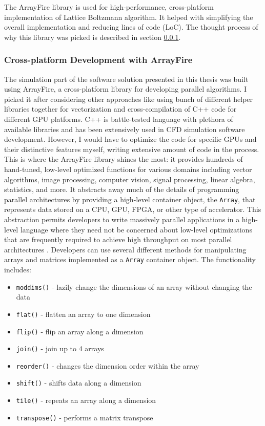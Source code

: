 The ArrayFire library is used for high-performance, cross-platform implementation of Lattice Boltzmann algorithm. It helped with simplifying the overall implementation and reducing lines of code (LoC). The thought process of why this library was picked is described in section \ref{sec:cross-platform-af}.

\subsubsection{Cross-platform Development with ArrayFire}\label{sec:cross-platform-af}
The simulation part of the software solution presented in this thesis was built using ArrayFire, a cross-platform library for developing parallel algorithms. I picked it after considering other approaches like using bunch of different helper libraries together for vectorization and cross-compilation of C++ code for different GPU platforms. C++ is battle-tested language with plethora of available libraries and has been extensively used in CFD simulation software development. However, I would have to optimize the code for specific GPUs and their distinctive features myself, writing extensive amount of code in the process. This is where the ArrayFire library shines the most: it provides hundreds of hand-tuned, low-level optimized functions for various domains including vector algorithms, image processing, computer vision, signal processing, linear algebra, statistics, and more. It abstracts away much of the details of programming parallel architectures by providing a high-level container object, the \texttt{Array}, that represents data stored on a CPU, GPU, FPGA, or other type of accelerator. This abstraction permits developers to write massively parallel applications in a high-level language where they need not be concerned about low-level optimizations that are frequently required to achieve high throughput on most parallel architectures \citep{Yalamanchili2015}. Developers can use several different methods for manipulating arrays and matrices implemented as a \texttt{Array} container object. The functionality includes:

\begin{itemize}
	\item \texttt{moddims()} - lazily change the dimensions of an array without changing the data
	\item \texttt{flat()}  - flatten an array to one dimension
	\item \texttt{flip()}  - flip an array along a dimension
	\item \texttt{join()}  - join up to 4 arrays
	\item \texttt{reorder()}  - changes the dimension order within the array
	\item \texttt{shift()}  - shifts data along a dimension
	\item \texttt{tile()}  - repeats an array along a dimension
	\item \texttt{transpose()}  - performs a matrix transpose
\end{itemize}

